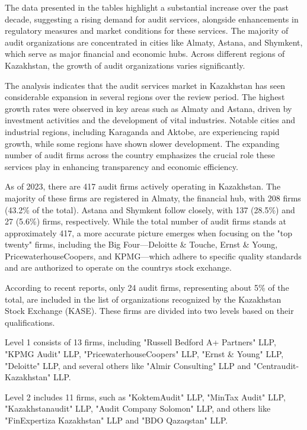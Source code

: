 The data presented in the tables highlight a substantial increase over
the past decade, suggesting a rising demand for audit services,
alongside enhancements in regulatory measures and market conditions for
these services. The majority of audit organizations are concentrated in
cities like Almaty, Astana, and Shymkent, which serve as major financial
and economic hubs. Across different regions of Kazakhstan, the growth of
audit organizations varies significantly.

The analysis indicates that the audit services market in Kazakhstan has
seen considerable expansion in several regions over the review period.
The highest growth rates were observed in key areas such as Almaty and
Astana, driven by investment activities and the development of vital
industries. Notable cities and industrial regions, including Karaganda
and Aktobe, are experiencing rapid growth, while some regions have shown
slower development. The expanding number of audit firms across the
country emphasizes the crucial role these services play in enhancing
transparency and economic efficiency.

As of 2023, there are 417 audit firms actively operating in Kazakhstan.
The majority of these firms are registered in Almaty, the financial hub,
with 208 firms (43.2\% of the total). Astana and Shymkent follow
closely, with 137 (28.5\%) and 27 (5.6\%) firms, respectively. While the
total number of audit firms stands at approximately 417, a more accurate
picture emerges when focusing on the "top twenty" firms, including the
Big Four---Deloitte \& Touche, Ernst \& Young, PricewaterhouseCoopers,
and KPMG---which adhere to specific quality standards and are authorized
to operate on the country\textquotesingle s stock exchange.

According to recent reports, only 24 audit firms, representing about 5\%
of the total, are included in the list of organizations recognized by
the Kazakhstan Stock Exchange (KASE). These firms are divided into two
levels based on their qualifications.

Level 1 consists of 13 firms, including "Russell Bedford A+ Partners"
LLP, "KPMG Audit" LLP, "PricewaterhouseCoopers" LLP, "Ernst \& Young"
LLP, "Deloitte" LLP, and several others like "Almir Consulting" LLP and
"Centraudit-Kazakhstan" LLP.

Level 2 includes 11 firms, such as "KoktemAudit" LLP, "MinTax Audit"
LLP, "Kazakhstanaudit" LLP, "Audit Company Solomon" LLP, and others like
"FinExpertiza Kazakhstan" LLP and "BDO Qazaqstan" LLP.

